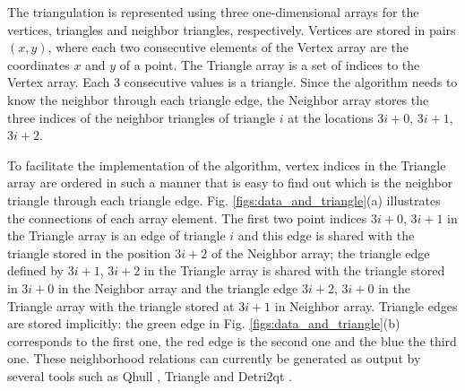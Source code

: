 \documentclass[lineno,pdflatex,sn-mathphys]{sn-jnl}%
\theoremstyle{thmstyleone}%
\theoremstyle{thmstyletwo}%
\theoremstyle{thmstylethree}%
\begin{document}
The triangulation is represented using three one-dimensional arrays for the vertices, triangles and neighbor triangles, respectively.  %
Vertices are stored in pairs $(x,y)$, where each two consecutive elements of the Vertex array are the coordinates $x$ and $y$ of a point. The Triangle array is a set of indices to the Vertex array. Each 3 consecutive values is a triangle. Since the algorithm needs to know the neighbor through each triangle edge, the Neighbor array  stores the three indices of the neighbor triangles of  triangle $i$ at the locations $3i + 0$, $3i + 1$, $3i + 2$. %

To facilitate the implementation of the algorithm, vertex indices in the Triangle array are ordered  in such a manner that is easy to find out which is the neighbor triangle through  each triangle edge. Fig. \ref{figs:data_and_triangle}(a) illustrates the connections of each array element. The first two point indices $3i+0$, $3i+1$ in the Triangle array is an edge of triangle $i$ and this edge is shared with the triangle stored in the position $3i+2$ of the Neighbor array; the triangle edge defined by $3i+1$, $3i+2$ in the Triangle array is shared with the triangle stored  in $3i+0$ in the Neighbor array and the triangle edge $3i+2$, $3i+0$ in the Triangle array with the triangle stored at $3i+1$ in Neighbor array. Triangle edges are stored implicitly: the green edge in Fig. \ref{figs:data_and_triangle}(b) corresponds to the first one,  the  red  edge is  the second one and the blue  the third one.  These neighborhood relations can currently be generated as output by several tools such as  Qhull \cite{qhull}, Triangle \cite{triangle2d} and Detri2qt \cite{Detri2}.
\end{document}
